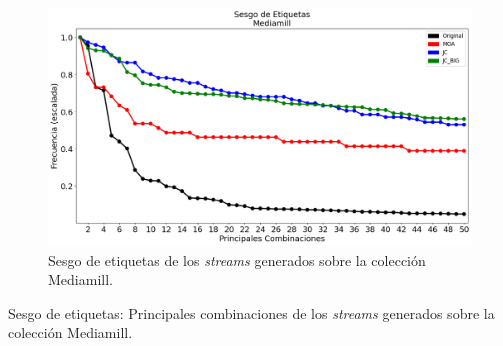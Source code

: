 \bigskip
\begin{figure}[htbp]
	\includegraphics[width=\linewidth]{figures/experiments/syn/mediamill/label_skew.png}
	\caption{Sesgo de etiquetas de los \textit{streams} generados sobre la
		colección Mediamill.}
	\label{fig:syn_mediamill_label_skew}
\end{figure}

\bigskip
\begin{table}[htbp]
	\centering
	\begin{adjustbox}{max width=\textwidth}
		
	\end{adjustbox}
	\caption{Sesgo de etiquetas: Principales combinaciones de los
		\textit{streams} generados sobre la colección Mediamill.}
	\label{tab:syn_mediamill_top_labels_combinations}
\end{table}
\bigskip

